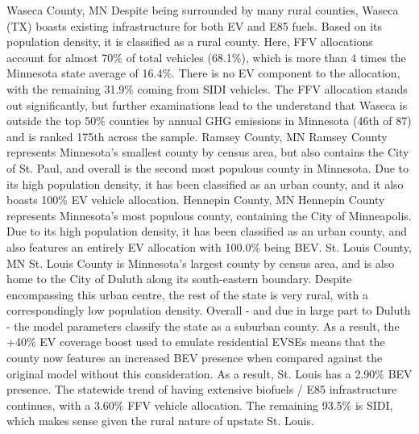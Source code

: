 \documentclass[answers]{exam}
\begin{document}
\begin{outline}
\1 Waseca County, MN
\2 Despite being surrounded by many rural counties, Waseca (TX) boasts existing infrastructure for both EV and E85 fuels. Based on its population density, it is classified as a rural county. Here, FFV allocations account for almost 70\% of total vehicles (68.1\%), which is more than 4 times the Minnesota state average of 16.4\%. There is no EV component to the allocation, with the remaining 31.9\% coming from SIDI vehicles. The FFV allocation stands out significantly, but further examinations lead to the understand that Waseca is outside the top 50\% counties by annual GHG emissions in Minnesota (46th of 87) and is ranked 175th across the sample.
\1 Ramsey County, MN
\2 Ramsey County represents Minnesota's smallest county by census area, but also contains the City of St. Paul, and overall is the second most populous county in Minnesota. Due to its high population density, it has been classified as an urban county, and it also boasts 100\% EV vehicle allocation. 
\1 Hennepin County, MN
\2 Hennepin County represents Minnesota's most populous county, containing the City of Minneapolis. Due to its high population density, it has been classified as an urban county, and also features an entirely EV allocation with 100.0\% being BEV.  
\1 St. Louis County, MN
\2 St. Louis County is Minnesota's largest county by census area, and is also home to the City of Duluth along its south-eastern boundary. Despite encompassing this urban centre, the rest of the state is very rural, with a correspondingly low population density. Overall - and due in large part to Duluth - the model parameters classify the state as a suburban county. As a result, the +40\% EV coverage boost used to emulate residential EVSEs means that the county now features an increased BEV presence when compared against the original model without this consideration. As a result, St. Louis has a 2.90\% BEV presence. The statewide trend of having extensive biofuels / E85 infrastructure continues, with a 3.60\% FFV vehicle allocation. The remaining 93.5\% is SIDI, which makes sense given the rural nature of upstate St. Louis.
\end{outline}
\end{document}

